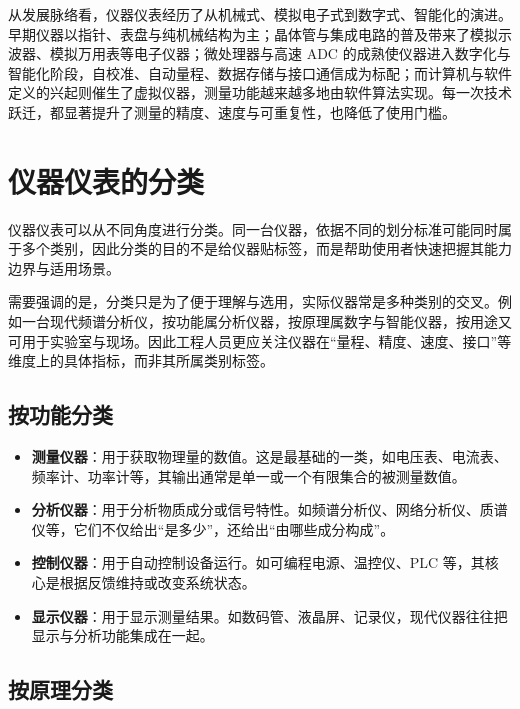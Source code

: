 从发展脉络看，仪器仪表经历了从机械式、模拟电子式到数字式、智能化的演进。早期仪器以指针、表盘与纯机械结构为主；晶体管与集成电路的普及带来了模拟示波器、模拟万用表等电子仪器；微处理器与高速 ADC 的成熟使仪器进入数字化与智能化阶段，自校准、自动量程、数据存储与接口通信成为标配；而计算机与软件定义的兴起则催生了虚拟仪器，测量功能越来越多地由软件算法实现。每一次技术跃迁，都显著提升了测量的精度、速度与可重复性，也降低了使用门槛。

\section{仪器仪表的分类}
\label{sec:instruments_classification}

仪器仪表可以从不同角度进行分类。同一台仪器，依据不同的划分标准可能同时属于多个类别，因此分类的目的不是给仪器贴标签，而是帮助使用者快速把握其能力边界与适用场景。

需要强调的是，分类只是为了便于理解与选用，实际仪器常是多种类别的交叉。例如一台现代频谱分析仪，按功能属分析仪器，按原理属数字与智能仪器，按用途又可用于实验室与现场。因此工程人员更应关注仪器在“量程、精度、速度、接口”等维度上的具体指标，而非其所属类别标签。

\subsection{按功能分类}

\begin{itemize}
    \item \textbf{测量仪器}：用于获取物理量的数值。这是最基础的一类，如电压表、电流表、频率计、功率计等，其输出通常是单一或一个有限集合的被测量数值。
    \item \textbf{分析仪器}：用于分析物质成分或信号特性。如频谱分析仪、网络分析仪、质谱仪等，它们不仅给出“是多少”，还给出“由哪些成分构成”。
    \item \textbf{控制仪器}：用于自动控制设备运行。如可编程电源、温控仪、PLC 等，其核心是根据反馈维持或改变系统状态。
    \item \textbf{显示仪器}：用于显示测量结果。如数码管、液晶屏、记录仪，现代仪器往往把显示与分析功能集成在一起。
\end{itemize}

\subsection{按原理分类}

